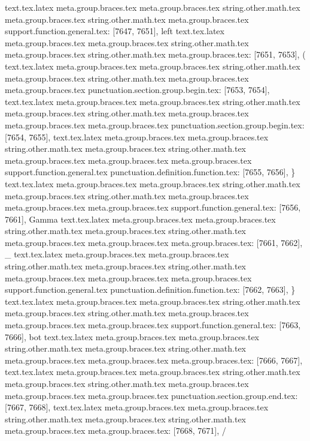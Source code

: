 {{{{{{{{{{{{{{{{{{{{{{{{{{{{{{{{{{{{{{{{{{{{{{{{{{{{{{{{{{{{{{{{{{{{{{{{{{{{{{{{{{{{{{{{{{{{{{{{{{{{{{{{{{{{{{{{{{{{{{{{{{{{{{{{{{{{{{{{{{{{{{{{{{{{{{{{{{{{{{{{{{{{{{{{{{{{{{{{{{{{{{{{{{{{{{{{{{{{{{{{{{{{{{{{{{{{{{{text.tex.latex meta.group.braces.tex meta.group.braces.tex string.other.math.tex meta.group.braces.tex string.other.math.tex meta.group.braces.tex support.function.general.tex: [7647, 7651], {left}
text.tex.latex meta.group.braces.tex meta.group.braces.tex string.other.math.tex meta.group.braces.tex string.other.math.tex meta.group.braces.tex: [7651, 7653], {( }
text.tex.latex meta.group.braces.tex meta.group.braces.tex string.other.math.tex meta.group.braces.tex string.other.math.tex meta.group.braces.tex meta.group.braces.tex punctuation.section.group.begin.tex: [7653, 7654], {{}
text.tex.latex meta.group.braces.tex meta.group.braces.tex string.other.math.tex meta.group.braces.tex string.other.math.tex meta.group.braces.tex meta.group.braces.tex meta.group.braces.tex punctuation.section.group.begin.tex: [7654, 7655], {{}
text.tex.latex meta.group.braces.tex meta.group.braces.tex string.other.math.tex meta.group.braces.tex string.other.math.tex meta.group.braces.tex meta.group.braces.tex meta.group.braces.tex support.function.general.tex punctuation.definition.function.tex: [7655, 7656], {\}
text.tex.latex meta.group.braces.tex meta.group.braces.tex string.other.math.tex meta.group.braces.tex string.other.math.tex meta.group.braces.tex meta.group.braces.tex meta.group.braces.tex support.function.general.tex: [7656, 7661], {Gamma}
text.tex.latex meta.group.braces.tex meta.group.braces.tex string.other.math.tex meta.group.braces.tex string.other.math.tex meta.group.braces.tex meta.group.braces.tex meta.group.braces.tex: [7661, 7662], {_}
text.tex.latex meta.group.braces.tex meta.group.braces.tex string.other.math.tex meta.group.braces.tex string.other.math.tex meta.group.braces.tex meta.group.braces.tex meta.group.braces.tex support.function.general.tex punctuation.definition.function.tex: [7662, 7663], {\}
text.tex.latex meta.group.braces.tex meta.group.braces.tex string.other.math.tex meta.group.braces.tex string.other.math.tex meta.group.braces.tex meta.group.braces.tex meta.group.braces.tex support.function.general.tex: [7663, 7666], {bot}
text.tex.latex meta.group.braces.tex meta.group.braces.tex string.other.math.tex meta.group.braces.tex string.other.math.tex meta.group.braces.tex meta.group.braces.tex meta.group.braces.tex: [7666, 7667], { }
text.tex.latex meta.group.braces.tex meta.group.braces.tex string.other.math.tex meta.group.braces.tex string.other.math.tex meta.group.braces.tex meta.group.braces.tex meta.group.braces.tex punctuation.section.group.end.tex: [7667, 7668], {}}
text.tex.latex meta.group.braces.tex meta.group.braces.tex string.other.math.tex meta.group.braces.tex string.other.math.tex meta.group.braces.tex meta.group.braces.tex: [7668, 7671], { / }
}}}}}}}}}}}}}}}}}}}}}}}}}}}}}}}}}}}}}}}}}}}}}}}}}}}}}}}}}}}}}}}}}}}}}}}}}}}}}}}}}}}}}}}}}}}}}}}}}}}}}}}}}}}}}}}}}}}}}}}}}}}}}}}}}}}}}}}}}}}}}}}}}}}}}}}}}}}}}}}}}}}}}}}}}}}}}}}}}}}}}}}}}}}}}}}}}}}}}}}}}}}}}}}}}}}}}}}}}}
